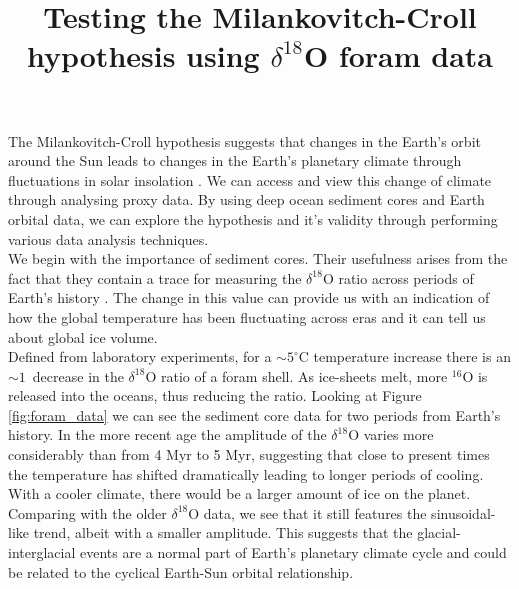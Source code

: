 \documentclass[12pt, onecolumn]{revtex4}    %
\begin{document}
                     

\title{Testing the Milankovitch-Croll hypothesis using $\delta^{18}$O foram data} 
\maketitle

\vspace{-4ex}

The Milankovitch-Croll hypothesis suggests that changes in the Earth's orbit around the Sun leads to changes in the Earth's planetary climate through fluctuations in solar insolation \cite{ruddiman_climate}. We can access and view this change of climate through analysing proxy data. By using deep ocean sediment cores and Earth orbital data, we can explore the hypothesis and it's validity through performing various data analysis techniques. \\

We begin with the importance of sediment cores. Their usefulness arises from the fact that they contain a trace for measuring the $\delta^{18}$O ratio across periods of Earth's history \cite{droxler_climate}. The change in this value can provide us with an indication of how the global temperature has been fluctuating across eras and it can tell us about global ice volume. \\

Defined from laboratory experiments, for a $\sim 5^{\circ}\mathrm{C}$ temperature increase there is an $\sim 1$\textperthousand\ decrease in the $\delta^{18}$O ratio of a foram shell. As ice-sheets melt, more $^{16}$O is released into the oceans, thus reducing the ratio. Looking at Figure \ref{fig:foram_data} we can see the sediment core data for two periods from Earth's history. In the more recent age the amplitude of the $\delta^{18}$O varies more considerably than from 4 Myr to 5 Myr, suggesting that close to present times the temperature has shifted dramatically leading to longer periods of cooling. With a cooler climate, there would be a larger amount of ice on the planet. Comparing with the older $\delta^{18}$O data, we see that it still features the sinusoidal-like trend, albeit with a smaller amplitude. This suggests that the glacial-interglacial events are a normal part of Earth's planetary climate cycle and could be related to the cyclical Earth-Sun orbital relationship. \\

\end{document}
